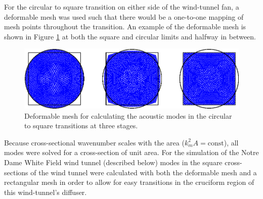 For the circular to square transition on either side of the wind-tunnel fan, a deformable mesh was used such that there would be a one-to-one mapping of mesh points throughout the transition.
An example of the deformable mesh is shown in Figure \ref{fig:deformable_mesh} at both the square and circular limits and halfway in between.
\begin{figure}
  \centering
  \includegraphics[width=\textwidth]{../matlab/03_aero_optics_acoustics/deformable_mesh.eps}
  \caption{Deformable mesh for calculating the acoustic modes in the circular to square transitions at three stages.}
  \label{fig:deformable_mesh}
\end{figure}
Because cross-sectional wavenumber scales with the area ($k_m^2A=\textrm{const}$), all modes were solved for a cross-section of unit area.
For the simulation of the Notre Dame White Field wind tunnel (described below) modes in the square cross-sections of the wind tunnel were calculated with both the deformable mesh and a rectangular mesh in order to allow for easy transitions in the cruciform region of this wind-tunnel's diffuser.

